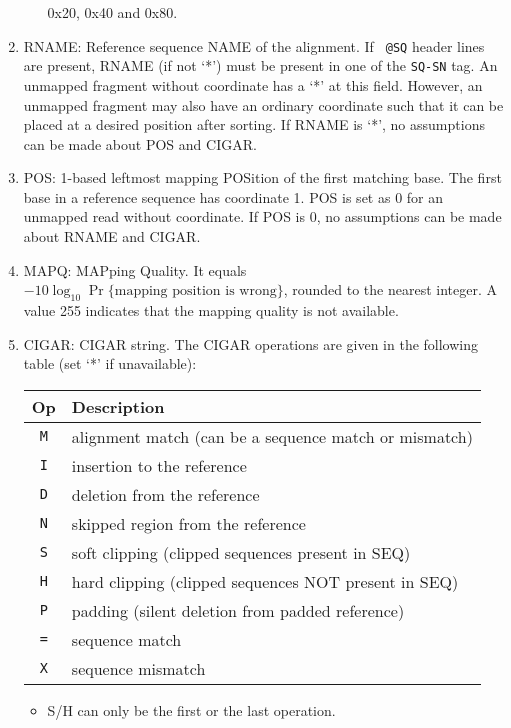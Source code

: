 \documentclass[10pt]{article}
\begin{document}
\begin{enumerate}
\begin{itemize}
    0x20, 0x40 and 0x80.
  \end{itemize}
\item {\sf RNAME}: Reference sequence NAME of the alignment. If {\tt
    @SQ} header lines are present, {\sf RNAME} (if not `*') must be
  present in one of the {\tt SQ-SN} tag. An unmapped fragment without
  coordinate has a `*' at this field. However, an unmapped fragment may
  also have an ordinary coordinate such that it can be placed at a
  desired position after sorting. If {\sf RNAME} is `*', no assumptions
  can be made about {\sf POS} and {\sf CIGAR}.
\item {\sf POS}: 1-based leftmost mapping POSition of the first matching
  base. The first base in a reference sequence has coordinate 1. {\sf
    POS} is set as 0 for an unmapped read without coordinate. If {\sf
    POS} is 0, no assumptions can be made about {\sf RNAME} and {\sf
    CIGAR}.
\item {\sf MAPQ}: MAPping Quality. It equals
  $-10\log_{10}\Pr\{\mbox{mapping position is wrong}\}$, rounded to the
  nearest integer. A value 255 indicates that the mapping quality is not
  available.
\item {\sf CIGAR}: CIGAR string. The CIGAR operations are given in the
  following table (set `*' if unavailable):
  \begin{center}\small
  \begin{tabular}{cl}
  \hline
  Op & Description\\
  \hline
  {\tt M} & alignment match (can be a sequence match or mismatch)\\
  {\tt I} & insertion to the reference \\
  {\tt D} & deletion from the reference \\
  {\tt N} & skipped region from the reference \\
  {\tt S} & soft clipping (clipped sequences present in {\sf SEQ})\\
  {\tt H} & hard clipping (clipped sequences NOT present in {\sf SEQ})\\
  {\tt P} & padding (silent deletion from padded reference)\\
  {\tt =} & sequence match \\
  {\tt X} & sequence mismatch \\
  \hline
  \end{tabular}
  \end{center}
  \begin{itemize}
  \item S/H can only be the first or the last operation.

\end{itemize}
\end{enumerate}
\end{document}
